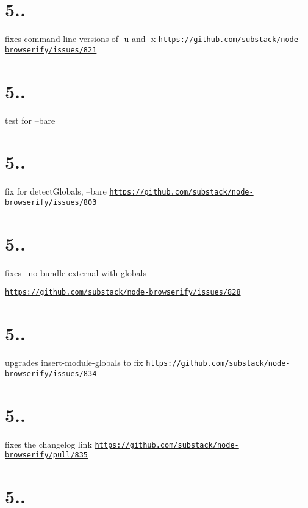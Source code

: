 \section*{5..}

fixes command-\/line versions of -\/u and -\/x \href{https://github.com/substack/node-browserify/issues/821}{\tt https\+://github.\+com/substack/node-\/browserify/issues/821}

\section*{5..}

test for --bare

\section*{5..}

fix for detect\+Globals, --bare \href{https://github.com/substack/node-browserify/issues/803}{\tt https\+://github.\+com/substack/node-\/browserify/issues/803}

\section*{5..}

fixes --no-\/bundle-\/external with globals

\href{https://github.com/substack/node-browserify/issues/828}{\tt https\+://github.\+com/substack/node-\/browserify/issues/828}

\section*{5..}

upgrades insert-\/module-\/globals to fix \href{https://github.com/substack/node-browserify/issues/834}{\tt https\+://github.\+com/substack/node-\/browserify/issues/834}

\section*{5..}

fixes the changelog link \href{https://github.com/substack/node-browserify/pull/835}{\tt https\+://github.\+com/substack/node-\/browserify/pull/835}

\section*{5..}

